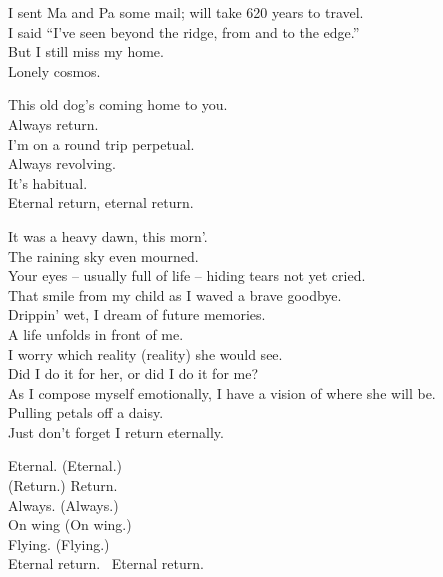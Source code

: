 
I sent Ma and Pa some mail; will take 620 years to travel. \\
I said ``I've seen beyond the ridge, from  and to the edge.'' \\
But I still miss my home. \\
Lonely cosmos. \\





This old dog's coming home to you. \\
Always return. \\
I'm on a round trip perpetual. \\
Always revolving. \\
It's habitual. \\
Eternal return, eternal return. \\


It was a heavy dawn, this morn'. \\
The raining sky even mourned. \\
Your eyes -- usually full of life -- hiding tears not yet cried. \\
That smile from my child as I waved a brave goodbye. \\
Drippin' wet, I dream of future memories. \\
A life unfolds in front of me. \\

I worry which reality (reality) she would see. \\
Did I do it for her, or did I do it for me? \\
As I compose myself emotionally, I have a vision of where she will be. \\
Pulling petals off a daisy. \\
Just don't forget I return eternally. \\


Eternal. (Eternal.) \\
(Return.) Return. \\
Always. (Always.) \\
On wing (On wing.) \\
Flying. (Flying.) \\
Eternal return. \
Eternal return. \\

